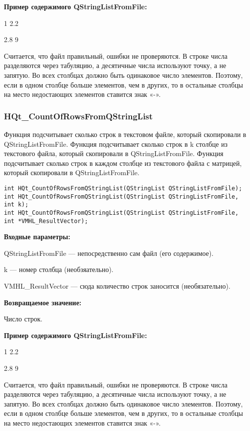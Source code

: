 \documentclass[a4paper,12pt]{article}
\begin{document}
\textbf{Пример содержимого QStringListFromFile:}

1	2.2

2.8	9

Считается, что файл правильный, ошибки не проверяются. В строке числа разделяются через табуляцию, а десятичные числа используют точку, а не запятую. Во всех столбцах должно быть одинаковое число элементов. Поэтому, если в одном столбце больше элементов, чем в других, то в остальные столбцы на место недостающих элементов ставится знак «-».


\subsubsection{HQt\_CountOfRowsFromQStringList}\label{HQt_CountOfRowsFromQStringList}

Функция подсчитывает сколько строк в текстовом файле, который скопировали в QStringListFromFile. Функция подсчитывает сколько строк в k столбце из текстового файла, который скопировали в QStringListFromFile. Функция подсчитывает сколько строк в каждом столбце из текстового файла с матрицей, который скопировали в QStringListFromFile.


\begin{lstlisting}[label=code_syntax_HQt_CountOfRowsFromQStringList,caption=Синтаксис]
int HQt_CountOfRowsFromQStringList(QStringList QStringListFromFile);
int HQt_CountOfRowsFromQStringList(QStringList QStringListFromFile, int k);
int HQt_CountOfRowsFromQStringList(QStringList QStringListFromFile, int *VMHL_ResultVector);
\end{lstlisting}

\textbf{Входные параметры:}

QStringListFromFile --- непосредственно сам файл (его содержимое).

k --- номер столбца (необзяательно).

 VMHL\_ResultVector --- сюда количество строк заносится (необязательно).

\textbf{Возвращаемое значение:}

Число строк.

\textbf{Пример содержимого QStringListFromFile:}

1	2.2

2.8	9

Считается, что файл правильный, ошибки не проверяются. В строке числа разделяются через табуляцию, а десятичные числа используют точку, а не запятую. Во всех столбцах должно быть одинаковое число элементов. Поэтому, если в одном столбце больше элементов, чем в других, то в остальные столбцы на место недостающих элементов ставится знак «-».
\end{document}
